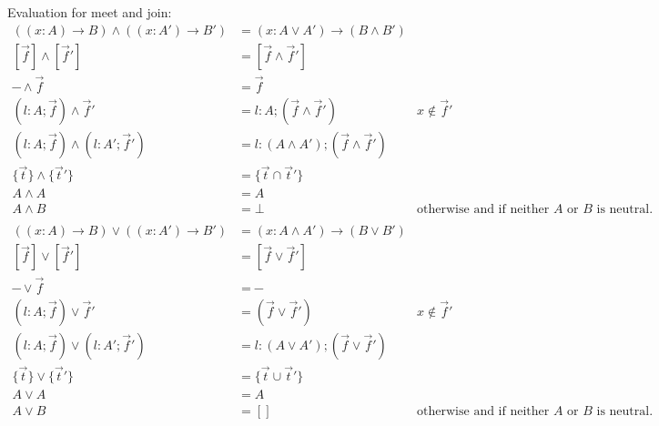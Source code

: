 \documentclass[11pt]{article}
\begin{document}
Evaluation for meet and join:
\begin{align*}
  ((x:A) → B) ∧ ((x:A') → B') &= (x:A ∨ A') → (B ∧ B') \\
  [\vec f] ∧ [\vec f']                  &= [\vec f ∧ \vec f'] \\
  ─ ∧ \vec f       &= \vec f \\
  (l:A;\vec f) ∧ \vec f'       &= l:A;(\vec f ∧ \vec f')  & x ∉ \vec f' \\
  (l:A;\vec f) ∧ (l:A';\vec f')       &= l:(A ∧ A');(\vec f ∧ \vec f') \\
  \{ \vec t \} ∧ \{ \vec t' \} & = \{ \vec t ∩ \vec t' \} \\
  A ∧ A & = A \\
  A ∧ B & = ⊥ & \text {otherwise and if neither $A$ or $B$ is neutral.} \\
\end{align*}
\begin{align*}
  ((x:A) → B) ∨ ((x:A') → B') &= (x:A ∧ A') → (B ∨ B') \\
  [\vec f] ∨ [\vec f']                  &= [\vec f ∨ \vec f'] \\
  ─ ∨ \vec f       &= ─ \\
  (l:A;\vec f) ∨ \vec f'       &= (\vec f ∨ \vec f')  & x ∉ \vec f' \\
  (l:A;\vec f) ∨ (l:A';\vec f')       &= l:(A ∨ A');(\vec f ∨ \vec f') \\
  \{ \vec t \} ∨ \{ \vec t' \} & = \{ \vec t ∪ \vec t' \} \\
  A ∨ A & = A \\
  A ∨ B & = [] & \text {otherwise and if neither $A$ or $B$ is neutral.}
\end{align*}



\end{document}
